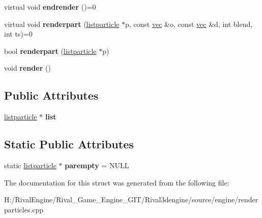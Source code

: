 \begin{DoxyCompactItemize}
virtual void {\bfseries endrender} ()=0
\item 
\mbox{\label{structlistrenderer_a7f2c3d2a9d27fb363408f57694cde384}} 
virtual void {\bfseries renderpart} (\hyperlink{structlistparticle}{listparticle} $\ast$p, const \hyperlink{structvec}{vec} \&o, const \hyperlink{structvec}{vec} \&d, int blend, int ts)=0
\item 
\mbox{\label{structlistrenderer_ab4608a76401d8a84b2d03cbeb6b1bab5}} 
bool {\bfseries renderpart} (\hyperlink{structlistparticle}{listparticle} $\ast$p)
\item 
\mbox{\label{structlistrenderer_a795596dac54aa6629c8a55ec38a46510}} 
void {\bfseries render} ()
\end{DoxyCompactItemize}
\subsection*{Public Attributes}
\begin{DoxyCompactItemize}
\item 
\mbox{\label{structlistrenderer_a67f9c81ebaefd76a1e23f17de8369798}} 
\hyperlink{structlistparticle}{listparticle} $\ast$ {\bfseries list}
\end{DoxyCompactItemize}
\subsection*{Static Public Attributes}
\begin{DoxyCompactItemize}
\item 
\mbox{\label{structlistrenderer_a3089dad9548680965c1bcb838805908a}} 
static \hyperlink{structlistparticle}{listparticle} $\ast$ {\bfseries parempty} = N\+U\+LL
\end{DoxyCompactItemize}


The documentation for this struct was generated from the following file\+:\begin{DoxyCompactItemize}
\item 
H\+:/\+Rival\+Engine/\+Rival\+\_\+\+Game\+\_\+\+Engine\+\_\+\+G\+I\+T/\+Rival3dengine/source/engine/renderparticles.\+cpp\end{DoxyCompactItemize}
